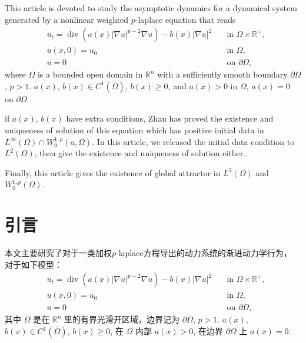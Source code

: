 \documentclass[twoside,longtitle]{LZUthesis}
\theoremstyle{definition}
\numberwithin{equation}{chapter}
\newcommand*\abs[1]{\lvert#1\rvert}
\newcommand\R{\mathbb{R}}
\DeclareMathOperator{\Div}{div}
\begin{document}

\begin{englishabstract}
This article is devoted to study the asymptotic dynamics for a dynamical system generated by a nonlinear
weighted $p$-laplace equation that reads
\begin{equation}\label{eq:main}
\begin{alignedat}{2}
& u_t = \Div(a(x)\abs{\nabla u}^{p-2}\nabla u) - b(x)\abs{\nabla u}^2 \quad &\text{in } \Omega \times \R^+,\\
& u(x,0) = u_0 \quad &\text{in } \Omega,\\
& u = 0 \quad &\text{on } \partial\Omega,
\end{alignedat}
\end{equation}
where $\Omega$ is a bounded open domain in $\R^{n}$ with a sufficiently smooth boundary $\partial\Omega$, $p>1$.
$ a(x)$, $b(x) \in C^1(\bar{\Omega}) $, $b(x) \geq 0$, and $a(x) > 0$ in $\Omega$, $a(x) = 0$ on $\partial\Omega$.

if $a(x)$, $b(x)$ have extra conditions, Zhan has proved the existence and uniqueness of solution of this equation
which has positive initial data in $L^{\infty}(\Omega) \cap W_0^{1,p}(a,\Omega)$. In this article, we released the
initial data condition to $L^2(\Omega)$, then give the existence and uniqueness of solution either.

Finally, this article gives the existence of global attractor in $L^2(\Omega)$ and $W_0^{1,p}(\Omega)$.
\end{englishabstract}


\tableofcontents{}


\mainmatter

\pagestyle{lzu}


\chapter{引言}
本文主要研究了对于一类加权$p$-laplace方程导出的动力系统的渐进动力学行为，
对于如下模型：
\begin{equation}\label{eq:main}
\begin{alignedat}{2}
& u_t = \Div(a(x)\abs{\nabla u}^{p-2}\nabla u) - b(x)\abs{\nabla u}^2 \quad &\text{in } \Omega \times \R^+,\\
& u(x,0) = u_0 \quad &\text{in } \Omega,\\
& u = 0 \quad &\text{on } \partial\Omega,
\end{alignedat}
\end{equation}
其中 $\Omega$ 是在 $\R^{n}$ 里的有界光滑开区域，边界记为 $\partial\Omega$, $p>1$.
$ a(x)$, $b(x) \in C^1(\bar{\Omega}) $, $b(x) \geq 0$, 在 $\Omega$ 内部 $a(x) > 0$, 在边界 $\partial\Omega$ 上 $a(x) = 0$.
\end{document}
